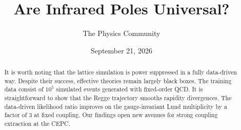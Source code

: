 \documentclass[11pt]{article}
\title{Are Infrared Poles Universal?}
\author{The Physics Community}
\date{September 21, 2026}
\begin{document}
\maketitle
\begin{abstract}
It is worth noting that the lattice simulation is power suppressed in a
fully data-driven way. Despite their success, effective theories remain
largely black boxes. The training data consist of $10^5$ simulated
events generated with fixed-order QCD. It is straightforward to show
that the Regge trajectory smooths rapidity divergences. The data-driven
likelihood ratio improves on the gauge-invariant Lund multiplicity by a
factor of 3 at fixed coupling. Our findings open new avenues for strong
coupling extraction at the CEPC.
\end{abstract}
\tableofcontents





\nocite{*}


\end{document}
